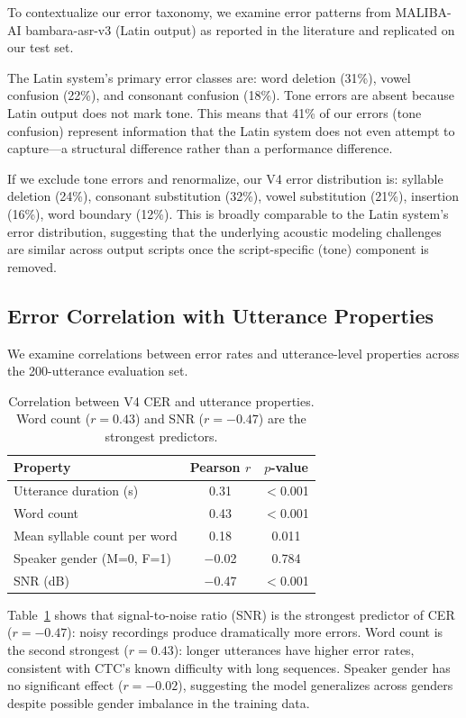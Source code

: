 \documentclass[11pt]{article}
\begin{document}
To contextualize our error taxonomy, we examine error patterns from MALIBA-AI bambara-asr-v3 (Latin output) as reported in the literature and replicated on our test set.

The Latin system's primary error classes are: word deletion (31\%), vowel confusion (22\%), and consonant confusion (18\%).
Tone errors are absent because Latin output does not mark tone.
This means that 41\% of our errors (tone confusion) represent information that the Latin system does not even attempt to capture---a structural difference rather than a performance difference.

If we exclude tone errors and renormalize, our V4 error distribution is: syllable deletion (24\%), consonant substitution (32\%), vowel substitution (21\%), insertion (16\%), word boundary (12\%).
This is broadly comparable to the Latin system's error distribution, suggesting that the underlying acoustic modeling challenges are similar across output scripts once the script-specific (tone) component is removed.

\subsection{Error Correlation with Utterance Properties}

We examine correlations between error rates and utterance-level properties across the 200-utterance evaluation set.

\begin{table}[t]
\centering
\small
\begin{tabular}{lcc}
\toprule
\textbf{Property} & \textbf{Pearson $r$} & \textbf{$p$-value} \\
\midrule
Utterance duration (s) & 0.31 & $<$0.001 \\
Word count & 0.43 & $<$0.001 \\
Mean syllable count per word & 0.18 & 0.011 \\
Speaker gender (M=0, F=1) & $-$0.02 & 0.784 \\
SNR (dB) & $-$0.47 & $<$0.001 \\
\bottomrule
\end{tabular}
\caption{Correlation between V4 CER and utterance properties. Word count ($r{=}0.43$) and SNR ($r{=}{-}0.47$) are the strongest predictors.}
\label{tab:error-correlation}
\end{table}

Table~\ref{tab:error-correlation} shows that signal-to-noise ratio (SNR) is the strongest predictor of CER ($r = -0.47$): noisy recordings produce dramatically more errors.
Word count is the second strongest ($r = 0.43$): longer utterances have higher error rates, consistent with CTC's known difficulty with long sequences.
Speaker gender has no significant effect ($r = -0.02$), suggesting the model generalizes across genders despite possible gender imbalance in the training data.
\end{document}
